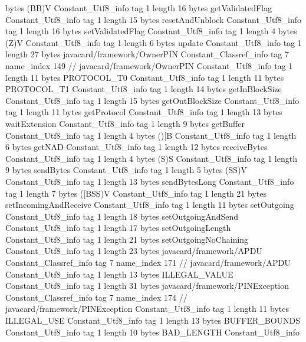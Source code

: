 {{{			bytes	(BB)V
		}
		Constant_Utf8_info {
			tag	1
			length	16
			bytes	getValidatedFlag
		}
		Constant_Utf8_info {
			tag	1
			length	15
			bytes	resetAndUnblock
		}
		Constant_Utf8_info {
			tag	1
			length	16
			bytes	setValidatedFlag
		}
		Constant_Utf8_info {
			tag	1
			length	4
			bytes	(Z)V
		}
		Constant_Utf8_info {
			tag	1
			length	6
			bytes	update
		}
		Constant_Utf8_info {
			tag	1
			length	27
			bytes	javacard/framework/OwnerPIN
		}
		Constant_Classref_info {
			tag	7
			name_index	149		// javacard/framework/OwnerPIN
		}
		Constant_Utf8_info {
			tag	1
			length	11
			bytes	PROTOCOL_T0
		}
		Constant_Utf8_info {
			tag	1
			length	11
			bytes	PROTOCOL_T1
		}
		Constant_Utf8_info {
			tag	1
			length	14
			bytes	getInBlockSize
		}
		Constant_Utf8_info {
			tag	1
			length	15
			bytes	getOutBlockSize
		}
		Constant_Utf8_info {
			tag	1
			length	11
			bytes	getProtocol
		}
		Constant_Utf8_info {
			tag	1
			length	13
			bytes	waitExtension
		}
		Constant_Utf8_info {
			tag	1
			length	9
			bytes	getBuffer
		}
		Constant_Utf8_info {
			tag	1
			length	4
			bytes	()[B
		}
		Constant_Utf8_info {
			tag	1
			length	6
			bytes	getNAD
		}
		Constant_Utf8_info {
			tag	1
			length	12
			bytes	receiveBytes
		}
		Constant_Utf8_info {
			tag	1
			length	4
			bytes	(S)S
		}
		Constant_Utf8_info {
			tag	1
			length	9
			bytes	sendBytes
		}
		Constant_Utf8_info {
			tag	1
			length	5
			bytes	(SS)V
		}
		Constant_Utf8_info {
			tag	1
			length	13
			bytes	sendBytesLong
		}
		Constant_Utf8_info {
			tag	1
			length	7
			bytes	([BSS)V
		}
		Constant_Utf8_info {
			tag	1
			length	21
			bytes	setIncomingAndReceive
		}
		Constant_Utf8_info {
			tag	1
			length	11
			bytes	setOutgoing
		}
		Constant_Utf8_info {
			tag	1
			length	18
			bytes	setOutgoingAndSend
		}
		Constant_Utf8_info {
			tag	1
			length	17
			bytes	setOutgoingLength
		}
		Constant_Utf8_info {
			tag	1
			length	21
			bytes	setOutgoingNoChaining
		}
		Constant_Utf8_info {
			tag	1
			length	23
			bytes	javacard/framework/APDU
		}
		Constant_Classref_info {
			tag	7
			name_index	171		// javacard/framework/APDU
		}
		Constant_Utf8_info {
			tag	1
			length	13
			bytes	ILLEGAL_VALUE
		}
		Constant_Utf8_info {
			tag	1
			length	31
			bytes	javacard/framework/PINException
		}
		Constant_Classref_info {
			tag	7
			name_index	174		// javacard/framework/PINException
		}
		Constant_Utf8_info {
			tag	1
			length	11
			bytes	ILLEGAL_USE
		}
		Constant_Utf8_info {
			tag	1
			length	13
			bytes	BUFFER_BOUNDS
		}
		Constant_Utf8_info {
			tag	1
			length	10
			bytes	BAD_LENGTH
		}
		Constant_Utf8_info {
}}}
